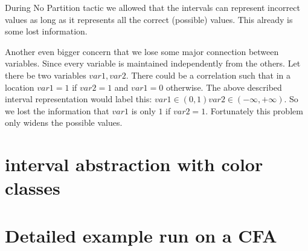 During No Partition tactic we allowed that the intervals can represent incorrect values as long as it represents all the correct (possible) values. This already is some lost information.

Another even bigger concern that we lose some major connection between variables. Since every variable is maintained independently from the others. Let there be two variables $var1, var2$. There could be a correlation such that in a location $var1=1$ if $var2=1$ and $var1=0$ otherwise. The above described interval representation would label this: $var1 \in (0, 1) var2 \in (-\infty, +\infty)$. So we lost the information that $var1$ is only $1$ if $var2=1$. Fortunately this problem only widens the possible values.

\section{interval abstraction with color classes}


\section{Detailed example run on a CFA}
\label{sec:detailedEx}

